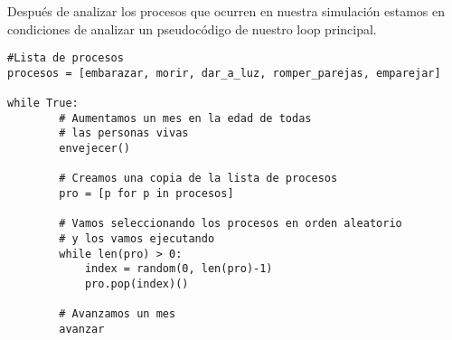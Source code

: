 \documentclass[12pt]{article}
\begin{document}
Despu\'es de analizar los procesos que ocurren en nuestra simulaci\'on estamos en condiciones de analizar un pseudoc\'odigo de nuestro loop principal.

\begin{lstlisting}
#Lista de procesos
procesos = [embarazar, morir, dar_a_luz, romper_parejas, emparejar]

while True:
        # Aumentamos un mes en la edad de todas
        # las personas vivas
        envejecer()

        # Creamos una copia de la lista de procesos
        pro = [p for p in procesos]

        # Vamos seleccionando los procesos en orden aleatorio
        # y los vamos ejecutando
        while len(pro) > 0:
            index = random(0, len(pro)-1)
            pro.pop(index)()

        # Avanzamos un mes
        avanzar
            
\end{lstlisting}
\end{document}

